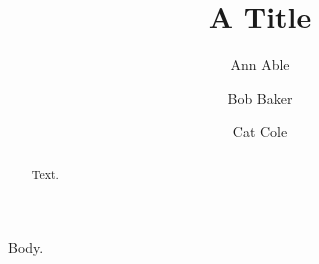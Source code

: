 \documentclass{llncs}
\begin{document}
\title{A Title}
\author{Ann Able \and Bob Baker \and Cat Cole}
\maketitle
\begin{abstract}Text.\end{abstract}
Body.
\end{document}
